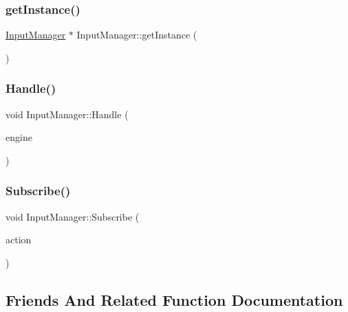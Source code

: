 \subsubsection{\texorpdfstring{get\+Instance()}{getInstance()}}
{\footnotesize\ttfamily \hyperlink{class_mason_1_1_input_manager}{Input\+Manager} $\ast$ Input\+Manager\+::get\+Instance (\begin{DoxyParamCaption}{ }\end{DoxyParamCaption})\hspace{0.3cm}{\ttfamily [static]}}

\hypertarget{class_mason_1_1_input_manager_a471142ccebfdb1574c342fa6a831f244}{}\label{class_mason_1_1_input_manager_a471142ccebfdb1574c342fa6a831f244} 
\subsubsection{\texorpdfstring{Handle()}{Handle()}}
{\footnotesize\ttfamily void Input\+Manager\+::\+Handle (\begin{DoxyParamCaption}\item[{\hyperlink{class_mason_1_1_engine}{Engine} $\ast$}]{engine }\end{DoxyParamCaption})}

\hypertarget{class_mason_1_1_input_manager_a14e32a051270da528c2c88674d8b5d22}{}\label{class_mason_1_1_input_manager_a14e32a051270da528c2c88674d8b5d22} 
\subsubsection{\texorpdfstring{Subscribe()}{Subscribe()}}
{\footnotesize\ttfamily void Input\+Manager\+::\+Subscribe (\begin{DoxyParamCaption}\item[{void($\ast$)(S\+D\+L\+\_\+\+Event)}]{action }\end{DoxyParamCaption})}



\subsection{Friends And Related Function Documentation}
\hypertarget{class_mason_1_1_input_manager_a3e1914489e4bed4f9f23cdeab34a43dc}{}\label{class_mason_1_1_input_manager_a3e1914489e4bed4f9f23cdeab34a43dc} 

